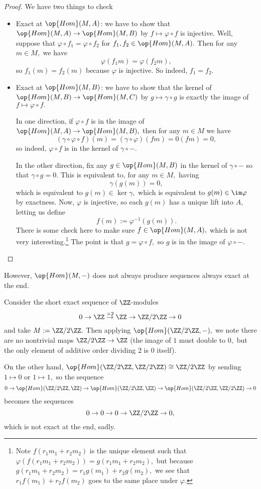 \documentclass[../notes.tex]{subfiles}
\begin{document}
\begin{proof}
	We have two things to check
	\begin{itemize}
		\item Exact at $\op{Hom}(M,A)$: we have to show that $\op{Hom}(M,A)\to\op{Hom}(M,B)$ by $f\mapsto\varphi\circ f$ is injective. Well, suppose that $\varphi\circ f_1=\varphi\circ f_2$ for $f_1,f_2\in\op{Hom}(M,A).$ Then for any $m\in M,$ we have
		\[\varphi(f_1m)=\varphi(f_2m),\]
		so $f_1(m)=f_2(m)$ because $\varphi$ is injective. So indeed, $f_1=f_2.$
		\item Exact at $\op{Hom}(M,B)$: we have to show that the kernel of $\op{Hom}(M,B)\to\op{Hom}(M,C)$ by $g\mapsto\gamma\circ g$ is exactly the image of $f\mapsto\varphi\circ f.$

		In one direction, if $\varphi\circ f$ is in the image of $\op{Hom}(M,A)\to\op{Hom}(M,B),$ then for any $m\in M$ we have
		\[(\gamma\circ\varphi\circ f)(m)=(\gamma\circ\varphi)(fm)=0(fm)=0,\]
		so indeed, $\varphi\circ f$ is in the kernel of $\gamma\circ-.$

		In the other direction, fix any $g\in\op{Hom}(M,B)$ in the kernel of $\gamma\circ-$ so that $\gamma\circ g=0.$ This is equivalent to, for any $m\in M,$ having
		\[\gamma(g(m))=0,\]
		which is equivalent to $g(m)\in\ker\gamma,$ which is equivalent to $g(m)\in\im\varphi$ by exactness. Now, $\varphi$ is injective, so each $g(m)$ has a unique lift into $A,$ letting us define
		\[f(m):=\varphi^{-1}(g(m)).\]
		There is some check here to make sure $f\in\op{Hom}(M,A),$ which is not very interesting.\footnote{Note $f(r_1m_1+r_2m_2)$ is the unique element such that $\varphi(f(r_1m_1+r_2m_2))=g(r_1m_1+r_2m_2),$ but because $g(r_1m_1+r_2m_2)=r_1g(m_1)+r_2g(m_2),$ we see that $r_1f(m_1)+r_2f(m_2)$ goes to the same place under $\varphi.$} The point is that $g=\varphi\circ f,$ so $g$ is in the image of $\varphi\circ-.$
		\qedhere
	\end{itemize}
\end{proof}
However, $\op{Hom}(M,-)$ does not always produce sequences always exact at the end.
\begin{example}
	Consider the short exact sequence of $\ZZ$-modules
	\[0\to\ZZ\stackrel{\times2}\to\ZZ\to\ZZ/2\ZZ\to0\]
	and take $M:=\ZZ/2\ZZ.$ Then applying $\op{Hom}(\ZZ/2\ZZ,-),$ we note there are no nontrivial maps $\ZZ/2\ZZ\to\ZZ$ (the image of $1$ must double to $0,$ but the only element of additive order dividing $2$ is $0$ itself).
	
	On the other hand, $\op{Hom}(\ZZ/2\ZZ,\ZZ/2\ZZ)\cong\ZZ/2\ZZ$ by sending $1\mapsto0$ or $1\mapsto1,$ so the sequence
	\[0\to\op{Hom}(\ZZ/2\ZZ,\ZZ)\to\op{Hom}(\ZZ/2\ZZ,\ZZ)\to\op{Hom}(\ZZ/2\ZZ,\ZZ/2\ZZ)\to0\]
	becomes the sequences
	\[0\to0\to0\to\ZZ/2\ZZ\to0,\]
	which is not exact at the end, sadly.
\end{example}
\end{document}

